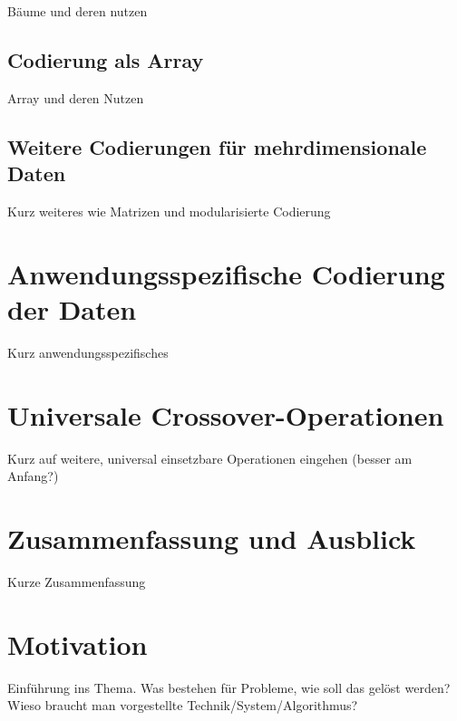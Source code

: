 \documentclass{llncs}
\begin{document}
Bäume und deren nutzen

\subsection{Codierung als Array}
\label{sec:ArrayCod}

Array und deren Nutzen

\subsection{Weitere Codierungen für mehrdimensionale Daten}
\label{sec:WeitereMehrdimensionale}

Kurz weiteres wie Matrizen und modularisierte Codierung

\section{Anwendungsspezifische Codierung der Daten}
\label{sec:AnwendungsspezifischeCod}

Kurz anwendungsspezifisches

\section{Universale Crossover-Operationen}
\label{sec:UniversaleOp}

Kurz auf weitere, universal einsetzbare Operationen eingehen (besser am Anfang?)

\section{Zusammenfassung und Ausblick}
\label{sec:Zusammenfassung}

Kurze Zusammenfassung

 






\newpage

\section{Motivation}
\label{sec:Motivation}
Einführung ins Thema. Was bestehen für Probleme, wie soll das gelöst werden? \\

Wieso braucht man vorgestellte Technik/System/Algorithmus?
\end{document}
